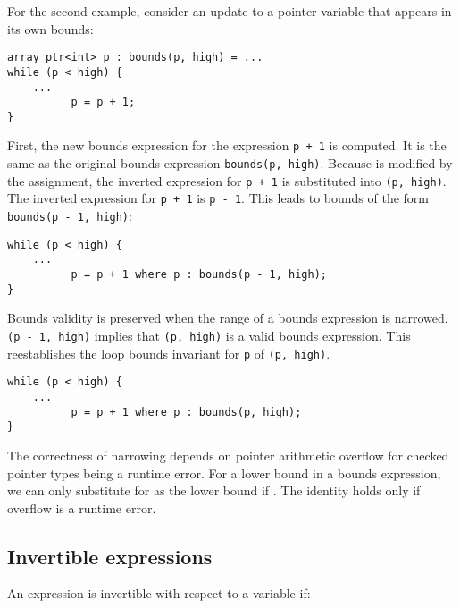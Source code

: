 For the second example, consider an update to a pointer variable that
appears in its own bounds:
\begin{lstlisting}
array_ptr<int> p : bounds(p, high) = ...         
while (p < high) {
    ...
          p = p + 1;
}
\end{lstlisting}

First, the new bounds expression for the expression \lstinline|p + 1| is
computed. It is the same as the original bounds expression
\lstinline|bounds(p, high)|. Because  is modified by the assignment, the
inverted expression for \lstinline|p + 1| is substituted into
\lstinline|(p, high)|. The inverted expression for \lstinline|p + 1| is \lstinline|p - 1|.
This leads to bounds of the form \lstinline|bounds(p - 1, high)|:

\begin{lstlisting}
while (p < high) {
    ...
          p = p + 1 where p : bounds(p - 1, high);
}
\end{lstlisting}

Bounds validity is preserved when the range of a bounds expression is
narrowed. \lstinline|(p - 1, high)| implies that \lstinline|(p, high)| is a
valid bounds expression. This reestablishes the loop bounds invariant
for \lstinline|p| of \lstinline|(p, high)|.

\begin{lstlisting}
while (p < high) {
    ...
          p = p + 1 where p : bounds(p, high);
}
\end{lstlisting}

The correctness of narrowing depends on pointer arithmetic overflow
for checked pointer types being a runtime error. For a lower bound  in a bounds
expression, we can only substitute  for  as the lower
bound if  \code{>=} . The identity  
holds only if overflow is a runtime error.

\subsection{Invertible expressions}
An expression is invertible with respect to a variable  if:


